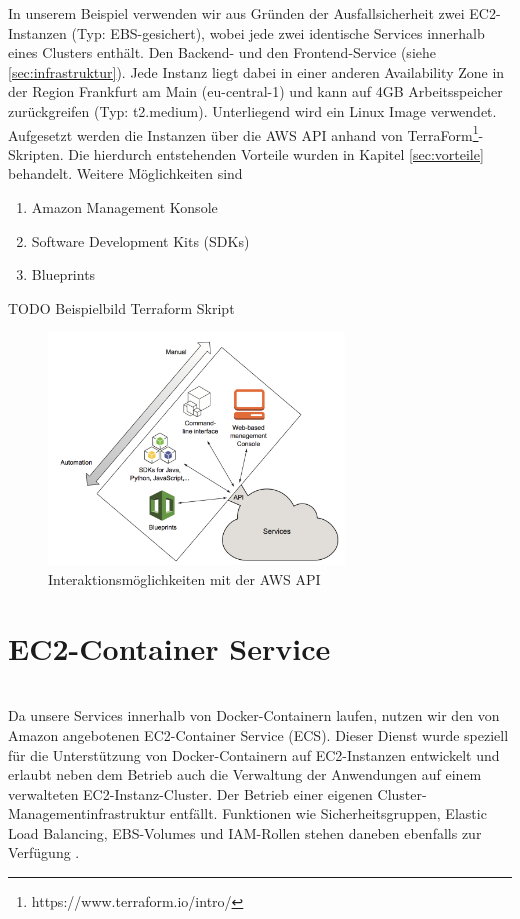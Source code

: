 In unserem Beispiel verwenden wir aus Gründen der Ausfallsicherheit zwei EC2-Instanzen (Typ: EBS-gesichert), wobei jede zwei identische Services innerhalb eines Clusters enthält. Den Backend- und den Frontend-Service (siehe \ref{sec:infrastruktur}). Jede Instanz liegt dabei in einer anderen Availability Zone in der Region Frankfurt am Main (eu-central-1) und kann auf 4GB Arbeitsspeicher zurückgreifen (Typ: t2.medium). Unterliegend wird ein Linux Image verwendet. \\
Aufgesetzt werden die Instanzen über die AWS API anhand von TerraForm\footnote{https://www.terraform.io/intro/}-Skripten. Die hierdurch entstehenden Vorteile wurden in Kapitel \ref{sec:vorteile} behandelt. Weitere Möglichkeiten sind
\begin{enumerate}
  \item Amazon Management Konsole
  \item Software Development Kits (SDKs)
  \item Blueprints
\end{enumerate} \cite{wittig:awsinaction}

TODO Beispielbild Terraform Skript

\begin{figure}[!ht]
  \centering
  \includegraphics[width=0.7\textwidth]{images/awsapi.png}
  \caption{Interaktionsmöglichkeiten mit der AWS API \cite{wittig:awsinaction}}
\end{figure}

\section{EC2-Container Service}
\label{sec:ecs}
\\Da unsere Services innerhalb von Docker-Containern laufen, nutzen wir den von Amazon angebotenen EC2-Container Service (ECS). Dieser Dienst wurde speziell für die Unterstützung von Docker-Containern auf EC2-Instanzen entwickelt und erlaubt neben dem Betrieb auch die Verwaltung der Anwendungen auf einem verwalteten EC2-Instanz-Cluster. Der Betrieb einer eigenen Cluster-Managementinfrastruktur entfällt. Funktionen wie Sicherheitsgruppen, Elastic Load Balancing, EBS-Volumes und IAM-Rollen stehen daneben ebenfalls zur Verfügung \cite{aws:ecs}.

